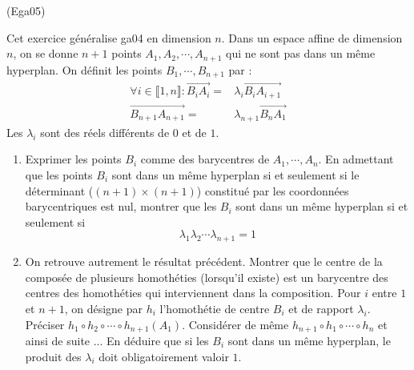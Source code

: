 \begin{tiny}(Ega05)\end{tiny} Cet exercice généralise ga04 en dimension $n$. Dans un espace affine de dimension $n$, on se donne $n+1$ points $A_1, A_2, \cdots, A_{n+1}$ qui ne sont pas dans un même hyperplan. On définit les points $B_1,\cdots,B_{n+1}$ par :
 \begin{align*}
  \forall i \in \llbracket 1,n\rrbracket : \overrightarrow{B_iA_i} =& \lambda_i \overrightarrow{B_iA_{i+1}}\\
\overrightarrow{B_{n+1}A_{n+1}} =& \lambda_{n+1} \overrightarrow{B_nA_{1}}
 \end{align*}
Les $\lambda_i$ sont des réels différents de $0$ et de $1$.
\begin{enumerate}
\item Exprimer les points $B_i$ comme des barycentres de $A_1,\cdots,A_n$. En admettant que les points $B_i$ sont dans un même hyperplan si et seulement si le déterminant ($(n+1)\times(n+1)$) constitué par les coordonnées barycentriques est nul, montrer que les $B_i$ sont dans un même hyperplan si et seulement si
\begin{displaymath}
 \lambda_1\lambda_2\cdots \lambda_{n+1}=1
\end{displaymath}
\item On retrouve autrement le résultat précédent.\newline
Montrer que le centre de la composée de plusieurs homothéties (lorsqu'il existe) est un barycentre des centres des homothéties qui interviennent dans la composition.\newline
Pour $i$ entre $1$ et $n+1$, on désigne par $h_i$ l'homothétie de centre $B_i$ et de rapport $\lambda_i$.\newline
Préciser $h_1\circ h_2\circ\cdots\circ h_{n+1}(A_1)$. Considérer de même $h_{n+1}\circ h_1\circ\cdots\circ h_{n}$ et ainsi de suite ... En déduire que si les $B_i$ sont dans un même hyperplan, le produit des $\lambda_i$ doit obligatoirement valoir $1$.
\end{enumerate}
